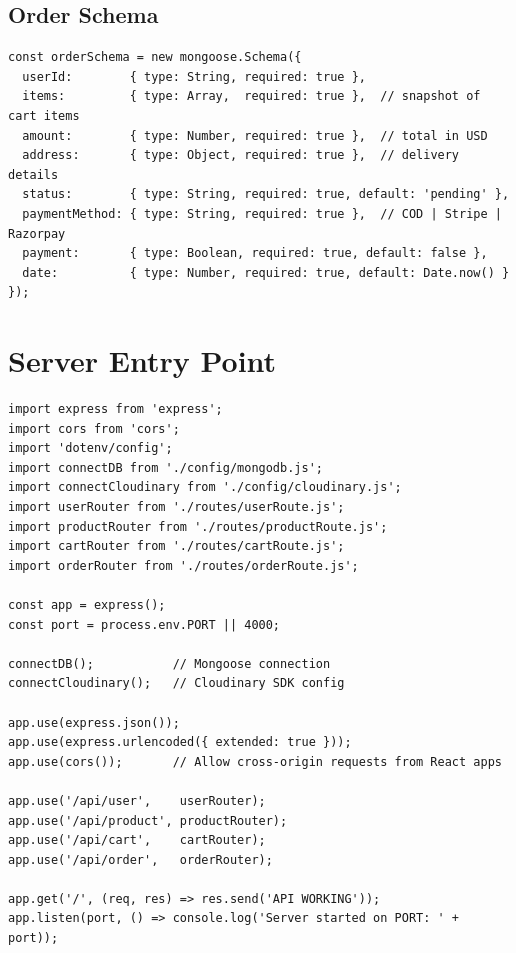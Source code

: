 \documentclass[12pt,a4paper]{report}
\begin{document}
\subsection{Order Schema}

\begin{lstlisting}[caption={orderModel.js}, label=lst:ordermodel]
const orderSchema = new mongoose.Schema({
  userId:        { type: String, required: true },
  items:         { type: Array,  required: true },  // snapshot of cart items
  amount:        { type: Number, required: true },  // total in USD
  address:       { type: Object, required: true },  // delivery details
  status:        { type: String, required: true, default: 'pending' },
  paymentMethod: { type: String, required: true },  // COD | Stripe | Razorpay
  payment:       { type: Boolean, required: true, default: false },
  date:          { type: Number, required: true, default: Date.now() }
});
\end{lstlisting}

\section{Server Entry Point}

\begin{lstlisting}[caption={server.js — application bootstrap}, label=lst:server]
import express from 'express';
import cors from 'cors';
import 'dotenv/config';
import connectDB from './config/mongodb.js';
import connectCloudinary from './config/cloudinary.js';
import userRouter from './routes/userRoute.js';
import productRouter from './routes/productRoute.js';
import cartRouter from './routes/cartRoute.js';
import orderRouter from './routes/orderRoute.js';

const app = express();
const port = process.env.PORT || 4000;

connectDB();           // Mongoose connection
connectCloudinary();   // Cloudinary SDK config

app.use(express.json());
app.use(express.urlencoded({ extended: true }));
app.use(cors());       // Allow cross-origin requests from React apps

app.use('/api/user',    userRouter);
app.use('/api/product', productRouter);
app.use('/api/cart',    cartRouter);
app.use('/api/order',   orderRouter);

app.get('/', (req, res) => res.send('API WORKING'));
app.listen(port, () => console.log('Server started on PORT: ' + port));
\end{lstlisting}
\end{document}
